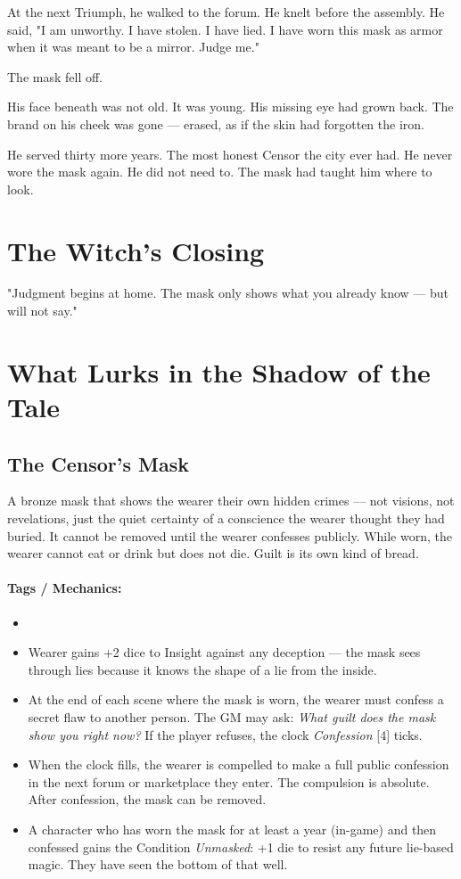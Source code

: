At the next Triumph, he walked to the forum. He knelt before the assembly. He said, "I am unworthy. I have stolen. I have lied. I have worn this mask as armor when it was meant to be a mirror. Judge me."

The mask fell off.

His face beneath was not old. It was young. His missing eye had grown back. The brand on his cheek was gone — erased, as if the skin had forgotten the iron.

He served thirty more years. The most honest Censor the city ever had. He never wore the mask again. He did not need to. The mask had taught him where to look.

\section*{The Witch's Closing}
"Judgment begins at home. The mask only shows what you already know — but will not say."

\section*{What Lurks in the Shadow of the Tale}

\subsection*{The Censor's Mask}

A bronze mask that shows the wearer their own hidden crimes — not visions, not revelations, just the quiet certainty of a conscience the wearer thought they had buried. It cannot be removed until the wearer confesses publicly. While worn, the wearer cannot eat or drink but does not die. Guilt is its own kind of bread.

\paragraph{Tags / Mechanics:}
\begin{itemize}
\item [CURSE] [TRUTH] [PRESSURE]
\item Wearer gains +2 dice to Insight against any deception — the mask sees through lies because it knows the shape of a lie from the inside.
\item At the end of each scene where the mask is worn, the wearer must confess a secret flaw to another person. The GM may ask: \textit{What guilt does the mask show you right now?} If the player refuses, the clock \textit{Confession} [4] ticks.
\item When the clock fills, the wearer is compelled to make a full public confession in the next forum or marketplace they enter. The compulsion is absolute. After confession, the mask can be removed.
\item A character who has worn the mask for at least a year (in-game) and then confessed gains the Condition \textit{Unmasked}: +1 die to resist any future lie-based magic. They have seen the bottom of that well.
\end{itemize}


